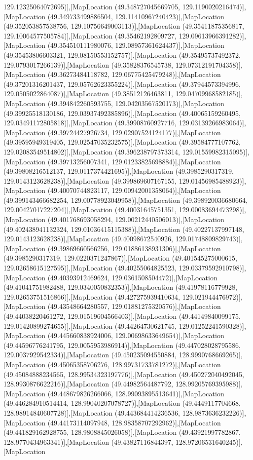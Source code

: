 129.12325064072695)],[MapLocation (49.348727045669705, 129.1190020216474)],[MapLocation (49.349733499886504, 129.11410967240423)],[MapLocation (49.352053857538756, 129.10756649003113)],[MapLocation (49.35411875356817, 129.10064577505784)],[MapLocation (49.35462192809727, 129.09613966391282)],[MapLocation (49.354510111980076, 129.08957361624437)],[MapLocation (49.35453806603321, 129.08150553152757)],[MapLocation (49.35495737492372, 129.0793017266139)],[MapLocation (49.35828376545738, 129.07312191704358)],[MapLocation (49.36273484118782, 129.06775425479248)],[MapLocation (49.37201316201437, 129.05762623355224)],[MapLocation (49.37944573394996, 129.0505022864087)],[MapLocation (49.38512126463811, 129.04709968582185)],[MapLocation (49.394842260593755, 129.04203567520173)],[MapLocation (49.39925518130186, 129.03937492385896)],[MapLocation (49.40065159260495, 129.03491172805818)],[MapLocation (49.39908760927716, 129.03139266983064)],[MapLocation (49.39724427926734, 129.02907524124177)],[MapLocation (49.39595949319405, 129.02547035232575)],[MapLocation (49.39584777107762, 129.02083549514802)],[MapLocation (49.396238797373314, 129.01559982315095)],[MapLocation (49.39713256007341, 129.01233825698884)],[MapLocation (49.39808216512137, 129.0117374421695)],[MapLocation (49.3985290317319, 129.0143123628238)],[MapLocation (49.399869607167155, 129.01456985488923)],[MapLocation (49.40070744823117, 129.00942001358064)],[MapLocation (49.399143466682254, 129.00778923049958)],[MapLocation (49.398920036680664, 129.00427017227204)],[MapLocation (49.40031645751351, 129.00083694473298)],[MapLocation (49.401768693058294, 129.00212440506013)],[MapLocation (49.402438941132324, 129.01036415115388)],[MapLocation (49.40227137997148, 129.0143123628238)],[MapLocation (49.40098672540926, 129.01748809829743)],[MapLocation (49.39869660566256, 129.01886138931306)],[MapLocation (49.3985290317319, 129.0220371247867)],[MapLocation (49.401545275000615, 129.02658615127595)],[MapLocation (49.40255064825523, 129.03379592910798)],[MapLocation (49.40393912469624, 129.0361508504472)],[MapLocation (49.41041751982488, 129.0340050832353)],[MapLocation (49.41978116779928, 129.02653751516866)],[MapLocation (49.427275939410634, 129.021944476972)],[MapLocation (49.43548664280557, 129.01881275320576)],[MapLocation (49.44038220461272, 129.01519604566403)],[MapLocation (49.44149840099175, 129.01420899274655)],[MapLocation (49.44264730621745, 129.01252241590328)],[MapLocation (49.445660838924006, 129.00698633649654)],[MapLocation (49.44596776241795, 129.0055953986914)],[MapLocation (49.447028028795586, 129.0037929542334)],[MapLocation (49.450235094550884, 128.9990768669265)],[MapLocation (49.45065358706276, 128.99731733781272)],[MapLocation (49.45084888234565, 128.99534323197776)],[MapLocation (49.450272040492045, 128.9930876622216)],[MapLocation (49.44982564487792, 128.99205769395988)],[MapLocation (49.448679826266066, 128.99093895513641)],[MapLocation (49.446284910514414, 128.99040207078727)],[MapLocation (49.4449117704668, 128.98914840607728)],[MapLocation (49.443684414236536, 128.9873636232226)],[MapLocation (49.44173114097948, 128.98358707292962)],[MapLocation (49.441829162928755, 128.9808845026058)],[MapLocation (49.43921997782867, 128.9770434963341)],[MapLocation (49.43827116844397, 128.97206531640245)],[MapLocation 
